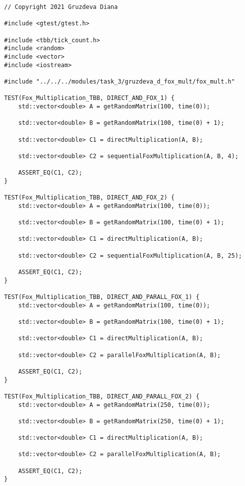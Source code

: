 \documentclass{article}
\begin{document}
\begin{lstlisting}
  // Copyright 2021 Gruzdeva Diana

  #include <gtest/gtest.h>

  #include <tbb/tick_count.h>
  #include <random>
  #include <vector>
  #include <iostream>

  #include "../../../modules/task_3/gruzdeva_d_fox_mult/fox_mult.h"

  TEST(Fox_Multiplication_TBB, DIRECT_AND_FOX_1) {
      std::vector<double> A = getRandomMatrix(100, time(0));

      std::vector<double> B = getRandomMatrix(100, time(0) + 1);

      std::vector<double> C1 = directMultiplication(A, B);

      std::vector<double> C2 = sequentialFoxMultiplication(A, B, 4);

      ASSERT_EQ(C1, C2);
  }

  TEST(Fox_Multiplication_TBB, DIRECT_AND_FOX_2) {
      std::vector<double> A = getRandomMatrix(100, time(0));

      std::vector<double> B = getRandomMatrix(100, time(0) + 1);

      std::vector<double> C1 = directMultiplication(A, B);

      std::vector<double> C2 = sequentialFoxMultiplication(A, B, 25);

      ASSERT_EQ(C1, C2);
  }

  TEST(Fox_Multiplication_TBB, DIRECT_AND_PARALL_FOX_1) {
      std::vector<double> A = getRandomMatrix(100, time(0));

      std::vector<double> B = getRandomMatrix(100, time(0) + 1);

      std::vector<double> C1 = directMultiplication(A, B);

      std::vector<double> C2 = parallelFoxMultiplication(A, B);

      ASSERT_EQ(C1, C2);
  }

  TEST(Fox_Multiplication_TBB, DIRECT_AND_PARALL_FOX_2) {
      std::vector<double> A = getRandomMatrix(250, time(0));

      std::vector<double> B = getRandomMatrix(250, time(0) + 1);

      std::vector<double> C1 = directMultiplication(A, B);

      std::vector<double> C2 = parallelFoxMultiplication(A, B);

      ASSERT_EQ(C1, C2);
  }


\end{lstlisting}
\end{document}
